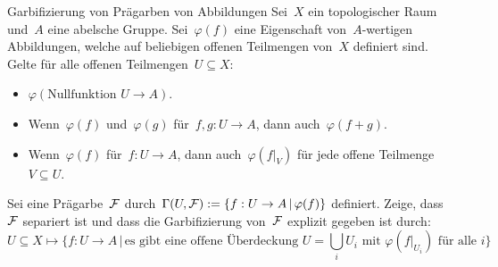 \documentclass{uebblatt}
\begin{document}
\begin{aufgabe}{Garbifizierung von Prägarben von Abbildungen}
Sei~$X$ ein topologischer Raum und~$A$ eine abelsche Gruppe. Sei~$\varphi(f)$
eine Eigenschaft von~$A$-wertigen Abbildungen, welche auf beliebigen offenen
Teilmengen von~$X$ definiert sind. Gelte für alle offenen Teilmengen~$U
\subseteq X$:
\begin{itemize}
\item $\varphi(\text{Nullfunktion~$U \to A$})$.
\item Wenn~$\varphi(f)$ und~$\varphi(g)$ für~$f,g:U \to A$, dann auch~$\varphi(f+g)$.
\item Wenn~$\varphi(f)$ für~$f:U \to A$, dann auch~$\varphi(f|_V)$ für jede
offene Teilmenge~$V \subseteq U$.
\end{itemize}
Sei eine Prägarbe~$\mathcal{F}$ durch~$\Gamma(U,\mathcal{F}) := \{ f : U \to A \,|\, \varphi(f)
\}$ definiert. Zeige, dass~$\mathcal{F}$ separiert ist und dass die Garbifizierung
von~$\mathcal{F}$ explizit gegeben ist durch:
\[ U \subseteq X \longmapsto
  \{ f : U \to A \,|\, \text{es gibt eine offene Überdeckung~$U = \bigcup_i
  U_i$ mit~$\varphi(f|_{U_i})$ für alle~$i$} \} \]
\end{aufgabe}
\end{document}
